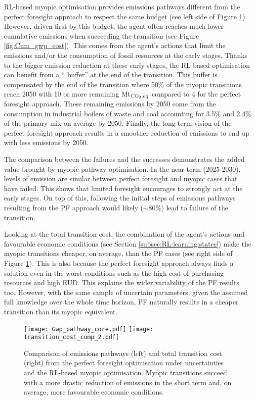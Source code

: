 \documentclass[11pt,twoside,a4paper,english]{article}
\begin{document}
\gls{RL}-based myopic optimisation provides  emissions pathways different from the perfect foresight approach to respect the same  budget (see left side of Figure \ref{fig:Gwp_pathway_total_tran_cost}). However, driven first by this  budget, the agent often reaches much lower cumulative emissions when succeeding the transition (see Figure \ref{fig:Cum_gwp_cost}). This comes from the agent's actions that limit the emissions and/or the consumption of fossil resources at the early stages. Thanks to the bigger emission reduction at these early stages, the \gls{RL}-based optimisation can benefit from a `` buffer'' at the end of the transition. This buffer is compensated by the end of the transition where 50\% of the myopic transitions reach 2050 with 10 or more remaining Mt$_{\ce{CO2},\text{eq}}$ compared to 4 for the perfect foresight approach. These remaining emissions by 2050 come from the consumption in industrial boilers of waste and coal accounting for 3.5\% and 2.4\% of the primary mix on average by 2050. Finally, the long-term vision of the perfect foresight approach results in a smoother reduction of emissions to end up with less emissions by 2050.

The comparison between the failures and the successes demonstrates the added value brought by myopic pathway optimisation. In the near term (2025-2030), levels of emission are similar between perfect foresight and myopic cases that have failed. This shows that limited foresight encourages to strongly act at the early stages. On top of this, following the initial steps of  emissions pathways resulting from the PF approach would likely ($\sim$80\%) lead to failure of the transition. 

Looking at the total transition cost, the combination of the agent's actions and favourable economic conditions (see Section \ref{subsec:RL:learning:states}) make the myopic transitions cheaper, on average, than the PF cases (see right side of Figure \ref{fig:Gwp_pathway_total_tran_cost}). This is also because the perfect foresight approach always finds a solution even in the worst conditions such as the high cost of purchasing resources and high \gls{EUD}. This explains the wider variability of the PF results too. However, with the same sample of uncertain parameters, given the assumed full knowledge over the whole time horizon, PF naturally results in a cheaper transition than its myopic equivalent.

\begin{figure}[!htbp]
\centering
\texttt{[image: Gwp\_pathway\_core.pdf]}
\texttt{[image: Transition\_cost\_comp\_2.pdf]}
\caption{Comparison of  emissions pathways (left) and total transition cost (right) from the perfect foresight optimisation under uncertainties and the \gls{RL}-based myopic optimisation. Myopic transitions succeed with a more drastic reduction of emissions in the short term and, on average, more favourable economic conditions.}
\label{fig:Gwp_pathway_total_tran_cost}
\end{figure}
\end{document}
